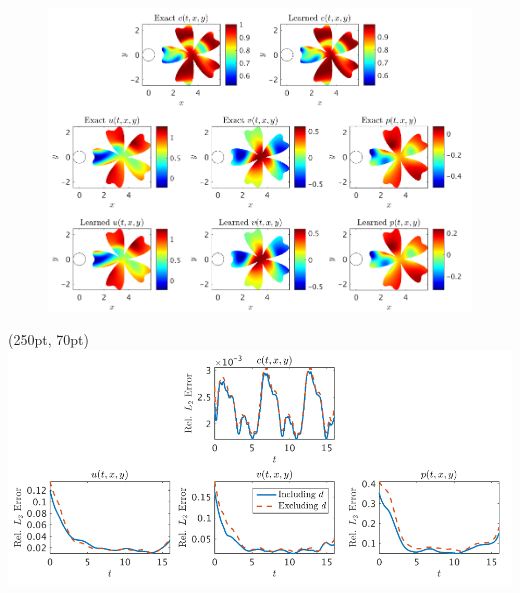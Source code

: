\documentclass[xcolor=dvipsnames,hyperref={breaklinks=true},mathserif,professionalfont,dvipdfmx,12pt]{beamer}
\begin{document}
\begin{frame}[t]
  \begin{figure}[H]
    \centering
      \includegraphics[width=0.9\linewidth]{figure/fig3.png}
  \end{figure}
  \begin{textblock*}{0.4\linewidth}(250pt, 70pt)
    \includegraphics[width=\linewidth]{figure/fig4.png}
    \end{textblock*}
\end{frame}
\end{document}
